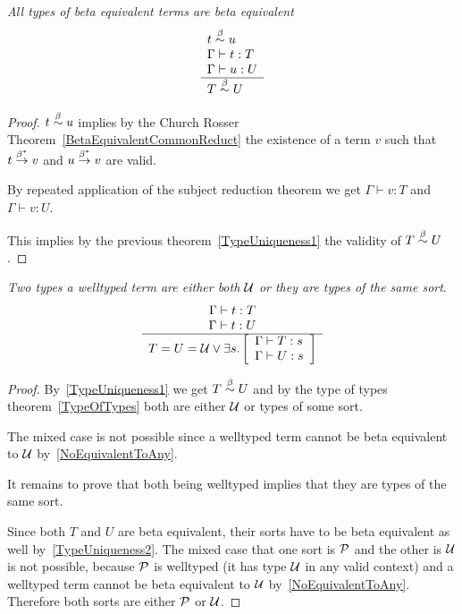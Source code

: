 \begin{theorem}
    \label{TypeUniqueness2}
    \emph{All types of beta equivalent terms are beta equivalent}
    $$
    \begin{array}{l} 
        t \stackrel{\beta}{\sim} u
        \\
        \Gamma \vdash t : T
        \\
        \Gamma \vdash u : U
     \\ \hline 
        T \stackrel{\beta}{\sim} U
    \end{array}
    $$

    \begin{proof}
        $ t \stackrel{\beta}{\sim} u$ implies by the Church Rosser
        Theorem~\ref{BetaEquivalentCommonReduct} the existence of a term $v$
        such that $t \stackrel{\beta^*}{\to} v$ and $u \stackrel{\beta^*}{\to} v$ are valid.

        By repeated application of the subject reduction theorem we get $\Gamma
        \vdash v : T$ and $\Gamma \vdash v : U$.

        This implies by the previous theorem~\ref{TypeUniqueness1} the validity
        of $T \stackrel{\beta}{\sim} U$.
    \end{proof}
\end{theorem}


\begin{corollary}
    \label{TypeUniqueness3}
    \emph{Two types a welltyped term are either both ${\cal U}$ or they are types of
    the same sort}.
    $$
    \begin{array}{c} 
        \Gamma \vdash t : T
        \\
        \Gamma \vdash t : U
     \\ \hline 
        T = U = {\cal U}
        \lor
        \exists s.
        \left[
        \begin{array}{l}
            \Gamma \vdash T : s
            \\
            \Gamma \vdash U : s
        \end{array}
        \right]
    \end{array}
    $$

    \begin{proof}
        By~\ref{TypeUniqueness1} we get $T \stackrel{\beta}{\sim} U$ and by the type of types
        theorem~\ref{TypeOfTypes} both are either ${\cal U}$ or types of some sort.

        The mixed case is not possible since a welltyped term cannot be beta
        equivalent to ${\cal U}$ by~\ref{NoEquivalentToAny}.

        It remains to prove that both being welltyped implies that they are
        types of the same sort.

        Since both $T$ and $U$ are beta equivalent, their sorts have to be beta
        equivalent as well by~\ref{TypeUniqueness2}. The mixed case that one
        sort is ${\cal P}$ and the other is ${\cal U}$ is not possible, because ${\cal P}$
        is welltyped (it has type ${\cal U}$ in any valid context) and a welltyped
        term cannot be beta equivalent to ${\cal U}$ by~\ref{NoEquivalentToAny}.
        Therefore both sorts are either ${\cal P}$ or ${\cal U}$.
    \end{proof}
\end{corollary}
